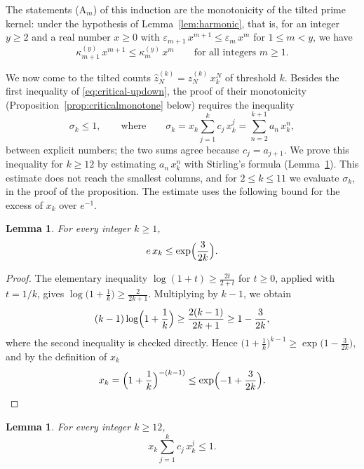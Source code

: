 \documentclass{amsart}
\newtheorem{lemma}[theorem]{Lemma}
\theoremstyle{definition}
\theoremstyle{remark}
\numberwithin{equation}{section}
\begin{document}
The statements (A$_m$) of this induction are the monotonicity of the tilted prime kernel: under the hypothesis of Lemma~\ref{lem:harmonic}, that is, for an integer $y\ge 2$ and a real number $x\ge 0$ with $\varepsilon_{m+1}\,x^{m+1}\le\varepsilon_m\,x^{m}$ for $1\le m<y$, we have
\begin{equation}\label{eq:critical-kerneldown}
\kappa^{(y)}_{m+1}\,x^{m+1}\le\kappa^{(y)}_m\,x^{m}\qquad\text{for all integers $m\ge 1$.}
\end{equation}

We now come to the tilted counts $\hat z^{(k)}_N=z^{(k)}_N\,x_k^{N}$ of threshold $k$. Besides the first inequality of \eqref{eq:critical-updown}, the proof of their monotonicity (Proposition~\ref{prop:criticalmonotone} below) requires the inequality
\begin{equation}\label{eq:critical-masscondition}
\sigma_k\le 1,\qquad\text{where}\qquad\sigma_k=x_k\sum_{j=1}^{k}c_j\,x_k^{j}=\sum_{n=2}^{k+1}a_n\,x_k^{n},
\end{equation}
between explicit numbers; the two sums agree because $c_j=a_{j+1}$. We prove this inequality for $k\ge 12$ by estimating $a_n\,x_k^{n}$ with Stirling's formula (Lemma~\ref{lem:cayleysum}). This estimate does not reach the smallest columns, and for $2\le k\le 11$ we evaluate $\sigma_k$, in the proof of the proposition. The estimate uses the following bound for the excess of $x_k$ over $e^{-1}$.

\begin{lemma}\label{lem:tiltupper}
For every integer $k\ge 1$,
\[
e\,x_k\le\exp\Bigl(\frac{3}{2k}\Bigr).
\]
\end{lemma}

\begin{proof}
The elementary inequality $\log(1+t)\ge\frac{2t}{2+t}$ for $t\ge 0$, applied with $t=1/k$, gives $\log\bigl(1+\frac1k\bigr)\ge\frac{2}{2k+1}$. Multiplying by $k-1$, we obtain
\[
(k-1)\log\Bigl(1+\frac1k\Bigr)\ge\frac{2(k-1)}{2k+1}\ge 1-\frac{3}{2k},
\]
where the second inequality is checked directly. Hence $\bigl(1+\frac1k\bigr)^{k-1}\ge\exp\bigl(1-\frac{3}{2k}\bigr)$, and by the definition of $x_k$
\[
x_k=\Bigl(1+\frac1k\Bigr)^{-(k-1)}\le\exp\Bigl(-1+\frac{3}{2k}\Bigr).\qedhere
\]
\end{proof}

\begin{lemma}\label{lem:cayleysum}
For every integer $k\ge 12$,
\[
x_k\sum_{j=1}^{k}c_j\,x_k^{j}\le 1.
\]
\end{lemma}
\end{document}
